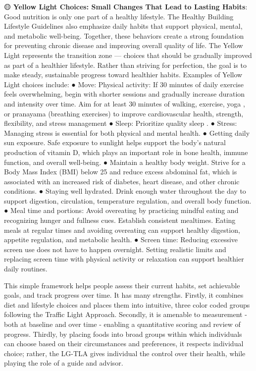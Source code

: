 \documentclass{article}
\begin{document}
🟡 \textbf{Yellow Light Choices: Small Changes That Lead to Lasting Habits}: Good nutrition is only one part of a healthy lifestyle. The Healthy Building Lifestyle Guidelines also emphasize daily habits that support physical, mental, and metabolic well-being. Together, these behaviors create a strong foundation for preventing chronic disease and improving overall quality of life. 
The Yellow Light represents the transition zone — choices that should be gradually improved as part of a healthier lifestyle. Rather than striving for perfection, the goal is to make steady, sustainable progress toward healthier habits.
Examples of Yellow Light choices include:
● Move: Physical activity: If 30 minutes of daily exercise \cite{WHO2024Physical} feels overwhelming, begin with shorter sessions and gradually increase duration and intensity over time. Aim for at least 30 minutes of walking, exercise, yoga \cite{Cramer2017Yoga}, or pranayama (breathing exercises) to improve cardiovascular health, strength, flexibility, and stress management \cite{Bull2020WHO}  
● Sleep: Prioritize quality sleep \cite{Wang2022Sleep}.
● Stress: Managing stress is essential for both physical and mental health.
● Getting daily sun exposure. Safe exposure to sunlight helps support the body's natural production of vitamin D, which plays an important role in bone health, immune function, and overall well-being.
● Maintain a healthy body weight. Strive for a Body Mass Index (BMI) below 25 and reduce excess abdominal fat, which is associated with an increased risk of diabetes, heart disease, and other chronic conditions. 
● Staying well hydrated. Drink enough water throughout the day to support digestion, circulation, temperature regulation, and overall body function.   
● Meal time and portions: Avoid overeating by practicing mindful eating and recognizing hunger and fullness cues. Establish consistent mealtimes. Eating meals at regular times and avoiding overeating can support healthy digestion, appetite regulation, and metabolic health.
● Screen time: Reducing excessive screen use does not have to happen overnight. Setting realistic limits and replacing screen time with physical activity or relaxation can support healthier daily routines.

This simple framework helps people assess their current habits, set achievable goals, and track progress over time. It has many strengths. Firstly, it combines diet and lifestyle choices and places them into intuitive, three color coded groups following the Traffic Light Approach. Secondly, it is amenable to measurement - both at baseline and over time - enabling a quantitative scoring and review of progress. Thirdly, by placing foods into broad groups within which individuals can choose based on their circumstances and preferences, it respects individual choice; rather, the LG-TLA gives  individual the control over their health, while playing the role of a guide and advisor. 
\end{document}
